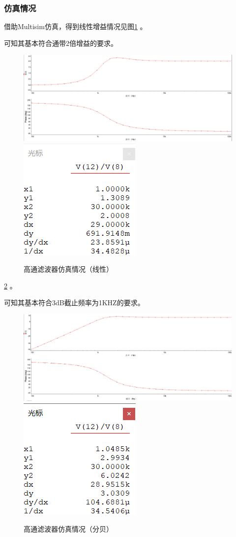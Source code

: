 \documentclass[12pt]{article}
\begin{document}
\subsubsection{仿真情况}
借助Multisim仿真，得到线性增益情况见图\ref{qzzyfzt11233}
。\par 可知其基本符合通带2倍增益的要求。
\begin{figure}[htbp]
  \centering
  \includegraphics[width=\textwidth]{picture/TIM20190505134845}\\
  \includegraphics[width=.3\textwidth]{picture/TIM20190505134934}
  \caption{高通滤波器仿真情况（线性）}\label{qzzyfzt11233}
\end{figure}\ref{qzzyfzt112133}
。\par 可知其基本符合3dB截止频率为1KHZ的要求。
\begin{figure}[htbp]
  \centering
  \includegraphics[width=\textwidth]{picture/TIM20190505135202}\\
  \includegraphics[width=.3\textwidth]{picture/TIM20190505135251}
  \caption{高通滤波器仿真情况（分贝）}\label{qzzyfzt112133}
\end{figure}
\end{document}
